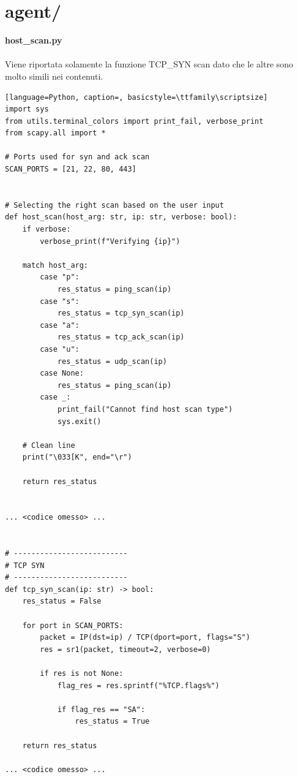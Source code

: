 \documentclass[12pt]{report}
\begin{document}
\section{agent/}

\noindent
\textbf{host\_scan.py}
\\\\
Viene riportata solamente la funzione TCP\_SYN scan dato che le altre sono molto simili nei contenuti.
\begin{lstlisting}[language=Python, caption=, basicstyle=\ttfamily\scriptsize]
import sys
from utils.terminal_colors import print_fail, verbose_print
from scapy.all import *

# Ports used for syn and ack scan
SCAN_PORTS = [21, 22, 80, 443]


# Selecting the right scan based on the user input
def host_scan(host_arg: str, ip: str, verbose: bool):
    if verbose:
        verbose_print(f"Verifying {ip}")

    match host_arg:
        case "p":
            res_status = ping_scan(ip)
        case "s":
            res_status = tcp_syn_scan(ip)
        case "a":
            res_status = tcp_ack_scan(ip)
        case "u":
            res_status = udp_scan(ip)
        case None:
            res_status = ping_scan(ip)
        case _:
            print_fail("Cannot find host scan type")
            sys.exit()

    # Clean line
    print("\033[K", end="\r")

    return res_status


... <codice omesso> ...


# --------------------------
# TCP SYN
# --------------------------
def tcp_syn_scan(ip: str) -> bool:
    res_status = False

    for port in SCAN_PORTS:
        packet = IP(dst=ip) / TCP(dport=port, flags="S")
        res = sr1(packet, timeout=2, verbose=0)

        if res is not None:
            flag_res = res.sprintf("%TCP.flags%")

            if flag_res == "SA":
                res_status = True

    return res_status

... <codice omesso> ...
\end{lstlisting}
\end{document}
